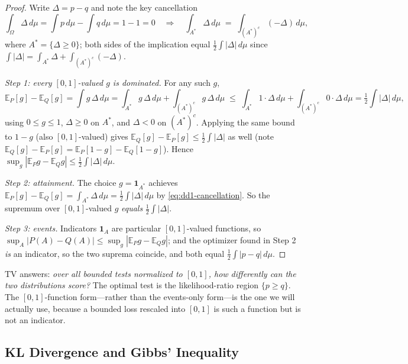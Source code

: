 \documentclass[11pt,a4paper]{article}
\theoremstyle{definition}
\theoremstyle{plain}
\newcommand{\E}{\mathbb{E}}
\newcommand{\TV}{\mathrm{TV}}
\begin{document}
\begin{proof}
Write $\Delta = p - q$ and note the key cancellation
\begin{equation}
\label{eq:dd1-cancellation}
\int_\Omega \Delta \, d\mu = \int p \, d\mu - \int q \, d\mu = 1 - 1 = 0
\quad\Longrightarrow\quad
\int_{A^*} \Delta \, d\mu \;=\; \int_{(A^*)^c} (-\Delta) \, d\mu ,
\end{equation}
where $A^* = \{\Delta \ge 0\}$; both sides of the implication equal
$\frac{1}{2}\int |\Delta| \, d\mu$ since
$\int |\Delta| = \int_{A^*} \Delta + \int_{(A^*)^c} (-\Delta)$.

\emph{Step 1: every $[0,1]$-valued $g$ is dominated.} For any such $g$,
\[
\E_P[g] - \E_Q[g] = \int g\, \Delta \, d\mu
= \int_{A^*} g\, \Delta \, d\mu + \int_{(A^*)^c} g\, \Delta \, d\mu
\;\le\; \int_{A^*} 1 \cdot \Delta \, d\mu + \int_{(A^*)^c} 0 \cdot \Delta \,
d\mu
= \tfrac{1}{2} \textstyle\int |\Delta| \, d\mu,
\]
using $0 \le g \le 1$, $\Delta \ge 0$ on $A^*$, and $\Delta < 0$ on
$(A^*)^c$. Applying the same bound to $1 - g$ (also $[0,1]$-valued) gives
$\E_Q[g] - \E_P[g] \le \frac{1}{2}\int|\Delta|$ as well (note
$\E_Q[g]-\E_P[g] = \E_P[1-g]-\E_Q[1-g]$). Hence
$\sup_g |\E_P g - \E_Q g| \le \frac{1}{2}\int |\Delta|\, d\mu$.

\emph{Step 2: attainment.} The choice $g = \mathbf{1}_{A^*}$ achieves
$\E_P[g] - \E_Q[g] = \int_{A^*} \Delta\, d\mu = \frac{1}{2}\int|\Delta|\,
d\mu$ by \eqref{eq:dd1-cancellation}. So the supremum over $[0,1]$-valued $g$
\emph{equals} $\frac{1}{2}\int |\Delta|$.

\emph{Step 3: events.} Indicators $\mathbf{1}_A$ are particular
$[0,1]$-valued functions, so
$\sup_A |P(A) - Q(A)| \le \sup_g |\E_P g - \E_Q g|$; and the optimizer found
in Step 2 \emph{is} an indicator, so the two suprema coincide, and both equal
$\frac{1}{2}\int|p - q|\,d\mu$.
\end{proof}

\begin{intuition}
$\TV$ answers: \emph{over all bounded tests normalized to $[0,1]$, how
differently can the two distributions score?} The optimal test is the
likelihood-ratio region $\{p \ge q\}$. The $[0,1]$-function form---rather
than the events-only form---is the one we will actually use, because a
bounded loss rescaled into $[0,1]$ is such a function but is not an
indicator.
\end{intuition}

\subsection{KL Divergence and Gibbs' Inequality}
\end{document}
